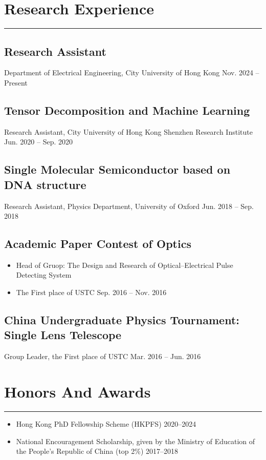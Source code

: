 \documentclass{article}
\newcommand{\cussection}[1]{\vspace{--0.05in}\section*{#1}\vspace{--0.1in} \hrule\vspace{0.2in} }
\begin{document}
\cussection{Research Experience}

\subsection*{Research Assistant}
Department of Electrical Engineering, City University of Hong Kong \hfill Nov. 2024 -- Present

\subsection*{Tensor Decomposition and Machine Learning}
Research Assistant, City University of Hong Kong Shenzhen Research Institute \hfill Jun. 2020 -- Sep. 2020

\subsection*{Single Molecular Semiconductor based on DNA structure}
Research Assistant, Physics Department, University of Oxford \hfill Jun. 2018 -- Sep. 2018

\subsection*{Academic Paper Contest of Optics}
\begin{itemize}
    \item Head of Gruop: The Design and Research of Optical--Electrical Pulse Detecting System
    \item The First place of USTC \hfill Sep. 2016 -- Nov. 2016
\end{itemize}

\subsection*{China Undergraduate Physics Tournament: Single Lens Telescope}
Group Leader, the First place of USTC \hfill Mar. 2016 -- Jun. 2016


\cussection{Honors And Awards}



\begin{itemize}
    \item Hong Kong PhD Fellowship Scheme (HKPFS) \hfill 2020--2024
    \item National Encouragement Scholarship, given by the Ministry of Education of the People’s Republic
          of China (top 2\%) \hfill 2017--2018
\end{itemize}
\end{document}
